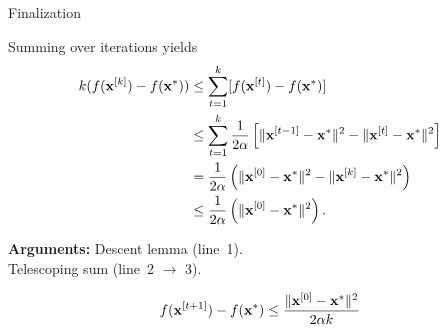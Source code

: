\documentclass[11pt,compress,t,notes=noshow, xcolor=table]{beamer}
\begin{document}
\begin{framei}{Finalization}
\item Summing over iterations yields
\begin{align*}
k ( f(\mathbf{x}^{[k]}) - f(\mathbf{x}^\ast)) &\leq \sum_{t=1}^{k} [f(\mathbf{x}^{[t]}) - f(\mathbf{x}^\ast)]\\
&\leq \sum_{t=1}^{k} \frac{1}{2 \alpha} \left[ \|\mathbf{x}^{[t-1]}-\mathbf{x}^\ast\|^2 - \| \mathbf{x}^{[t]} - \mathbf{x}^\ast \|^2 \right] \\
&= \frac{1}{2 \alpha}  \left( \|\mathbf{x}^{[0]}-\mathbf{x}^\ast\|^2 - \| \mathbf{x}^{[k]} - \mathbf{x}^\ast \|^2 \right) \\
&\leq \frac{1}{2 \alpha} \left( \|\mathbf{x}^{[0]}-\mathbf{x}^\ast\|^2 \right).
\end{align*}
\item\textbf{Arguments:} Descent lemma (line~1).\\ Telescoping sum (line~2 $\to$ 3).
\begin{framed}
$$f(\mathbf{x}^{[t+1]}) - f(\mathbf{x}^\ast) \leq \frac{\| \mathbf{x}^{[0]} - \mathbf{x}^\ast \|^2}{2\alpha k}$$
\end{framed}
\end{framei}	

\endlecture
\end{document}
